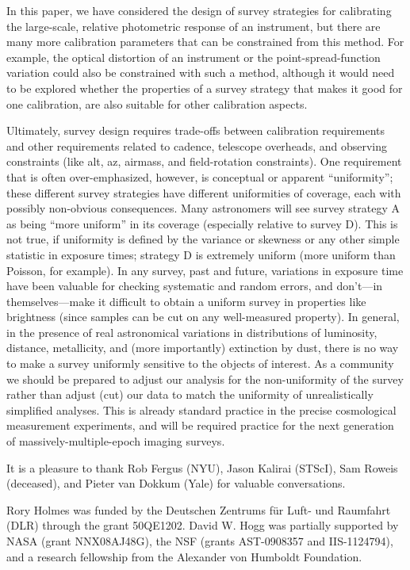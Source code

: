 \documentclass[preprint,pdftex]{aastex}
\begin{document}
In this paper, we have considered the design of survey strategies for calibrating the large-scale, relative photometric response of an instrument, but there are many more calibration parameters that can be constrained from this method. For example, the optical distortion of an instrument or the point-spread-function variation could also be constrained with such a method, although it would need to be explored whether the properties of a survey strategy that makes it good for one calibration, are also suitable for other calibration aspects.

Ultimately, survey design requires trade-offs between calibration
requirements and other requirements related to cadence, telescope
overheads, and observing constraints (like alt, az, airmass, and
field-rotation constraints).  One requirement that is often
over-emphasized, however, is conceptual or apparent ``uniformity'';
these different survey strategies have different uniformities of
coverage, each with possibly non-obvious consequences.  Many
astronomers will see survey strategy A as being ``more uniform'' in
its coverage (especially relative to survey D).  This is not true, if
uniformity is defined by the variance or skewness or any other simple
statistic in exposure times; strategy D is extremely uniform (more
uniform than Poisson, for example).  In any survey, past and future,
variations in exposure time have been valuable for checking systematic
and random errors, and don't---in themselves---make it difficult to
obtain a uniform survey in properties like brightness (since samples
can be cut on any well-measured property).  In general, in the
presence of real astronomical variations in distributions of
luminosity, distance, metallicity, and (more importantly) extinction
by dust, there is no way to make a survey uniformly sensitive to the
objects of interest.  As a community we should be prepared to adjust
our analysis for the non-uniformity of the survey rather than adjust
(cut) our data to match the uniformity of unrealistically simplified
analyses.  This is already standard practice in the precise
cosmological measurement experiments, and will be required practice
for the next generation of massively-multiple-epoch imaging surveys.

\acknowledgments
It is a pleasure to thank Rob Fergus (NYU), Jason Kalirai (STScI), Sam Roweis (deceased), and Pieter van Dokkum (Yale) for valuable conversations. 

Rory Holmes was funded by the Deutschen Zentrums f\"ur Luft- und Raumfahrt
(DLR) through the grant 50QE1202.  David W. Hogg was partially supported by NASA
(grant NNX08AJ48G), the NSF (grants AST-0908357 and IIS-1124794), and
a research fellowship from the Alexander von Humboldt Foundation.
\end{document}
